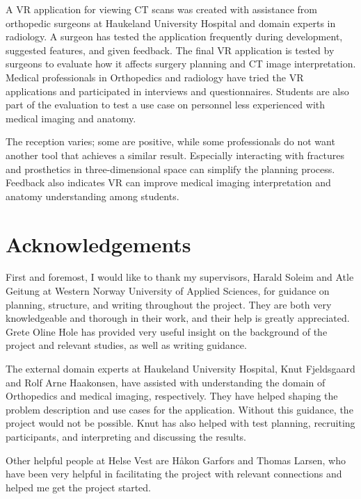 \documentclass[a4paper]{report}
\begin{document}
A VR application for viewing CT scans was created with assistance from orthopedic surgeons at Haukeland University Hospital and domain experts in radiology. A surgeon has tested the application frequently during development, suggested features, and given feedback.
The final VR application is tested by surgeons to evaluate how it affects surgery planning and CT image interpretation.
Medical professionals in Orthopedics and radiology have tried the VR applications and participated in interviews and questionnaires.
Students are also part of the evaluation to test a use case on personnel less experienced with medical imaging and anatomy.

The reception varies; some are positive, while some professionals do not want another tool that achieves a similar result. Especially interacting with fractures and prosthetics in three-dimensional space can simplify the planning process.
Feedback also indicates VR can improve medical imaging interpretation and anatomy understanding among students.

\pagebreak
\section*{Acknowledgements}
First and foremost, I would like to thank my supervisors, Harald Soleim and Atle Geitung at Western Norway University of Applied Sciences, for guidance on planning, structure, and writing throughout the project. They are both very knowledgeable and thorough in their work, and their help is greatly appreciated. Grete Oline Hole has provided very useful insight on the background of the project and relevant studies, as well as writing guidance.

The external domain experts at Haukeland University Hospital, Knut Fjeldsgaard and Rolf Arne Haakonsen, have assisted with understanding the domain of Orthopedics and medical imaging, respectively. They have helped shaping the problem description and use cases for the application. Without this guidance, the project would not be possible. Knut has also helped with test planning, recruiting participants, and interpreting and discussing the results.

Other helpful people at Helse Vest are Håkon Garfors and Thomas Larsen, who have been very helpful in facilitating the project with relevant connections and helped me get the project started.

\pagebreak
\tableofcontents
\listoffigures

\end{document}
